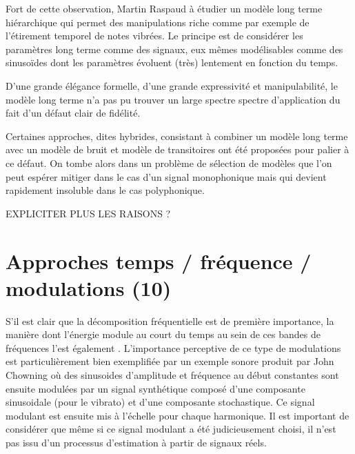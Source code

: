 Fort de cette observation, Martin Raspaud à étudier un modèle long terme hiérarchique qui permet des manipulations riche comme par exemple de l'étirement temporel de notes vibrées. Le principe est de considérer les paramètres long terme comme des signaux, eux mêmes modélisables comme des sinusoïdes dont les paramètres évoluent (très) lentement en fonction du temps.

D'une grande élégance formelle, d'une grande expressivité et manipulabilité, le modèle long terme n'a pas pu trouver un large spectre spectre d'application du fait d'un défaut clair de fidélité.

Certaines approches, dites hybrides, consistant à combiner un modèle long terme avec un modèle de bruit et modèle de transitoires ont été proposées pour palier à ce défaut. On tombe alors dans un problème de sélection de modèles que l'on peut espérer mitiger dans le cas d'un signal monophonique mais qui devient  rapidement insoluble dans le cas polyphonique.

EXPLICITER PLUS LES RAISONS ?

\section{Approches temps / fréquence / modulations (10)}

S'il est clair que la décomposition fréquentielle est de première importance, la manière dont l'énergie module au court du temps au sein de ces bandes de fréquences l'est également . L'importance perceptive de ce type de modulations est particulièrement bien exemplifiée par un exemple sonore produit par John Chowning où des sinusoides d'amplitude et fréquence au début constantes sont ensuite modulées par un signal synthétique composé d'une composante sinusoidale (pour le vibrato) et d'une composante stochastique. Ce signal modulant est ensuite mis à l'échelle pour chaque harmonique. Il est important de considérer que même si ce signal modulant a été judicieusement choisi, il n'est pas issu d'un processus d'estimation à partir de signaux réels.

